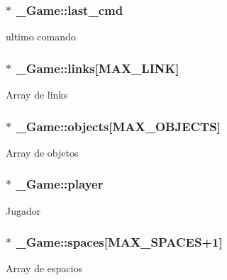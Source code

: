 \subsubsection[{\texorpdfstring{last\+\_\+cmd}{last_cmd}}]{$\ast$ \+\_\+\+Game\+::last\+\_\+cmd}\hypertarget{struct__Game_a6dd34045346b3ea8dd1a4e3f08ab71c5}{}\label{struct__Game_a6dd34045346b3ea8dd1a4e3f08ab71c5}
ultimo comando 
\subsubsection[{\texorpdfstring{links}{links}}]{$\ast$ \+\_\+\+Game\+::links\mbox{[}{\bf M\+A\+X\+\_\+\+L\+I\+NK}\mbox{]}}\hypertarget{struct__Game_aa4ff88aaf2a54616e5863609effad94e}{}\label{struct__Game_aa4ff88aaf2a54616e5863609effad94e}
Array de links 
\subsubsection[{\texorpdfstring{objects}{objects}}]{$\ast$ \+\_\+\+Game\+::objects\mbox{[}{\bf M\+A\+X\+\_\+\+O\+B\+J\+E\+C\+TS}\mbox{]}}\hypertarget{struct__Game_ad45bf5645a26e546d0060a2e61f9cf81}{}\label{struct__Game_ad45bf5645a26e546d0060a2e61f9cf81}
Array de objetos 
\subsubsection[{\texorpdfstring{player}{player}}]{$\ast$ \+\_\+\+Game\+::player}\hypertarget{struct__Game_a31406605782d71ec00c4bf258ea76267}{}\label{struct__Game_a31406605782d71ec00c4bf258ea76267}
Jugador 
\subsubsection[{\texorpdfstring{spaces}{spaces}}]{$\ast$ \+\_\+\+Game\+::spaces\mbox{[}{\bf M\+A\+X\+\_\+\+S\+P\+A\+C\+ES}+1\mbox{]}}\hypertarget{struct__Game_ab4180417d9148f8abb2233ca6c4ecfe5}{}\label{struct__Game_ab4180417d9148f8abb2233ca6c4ecfe5}
Array de espacios 
